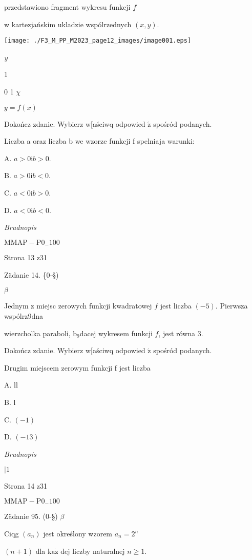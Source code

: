 \documentclass[a4paper,12pt]{article}
\begin{document}
przedstawiono fragment wykresu funkcji $f$

w kartezjańskim ukladzie wspólrzednych $(x,y).$
\begin{center}
\texttt{[image: ./F3\_M\_PP\_M2023\_page12\_images/image001.eps]}
\end{center}
{\it y}

1

0 1  $\chi$

$y=f(x)$

Dokończ zdanie. Wybierz w[aściwq odpowied $\acute{\mathrm{z}}$ spośród podanych.

Liczba a oraz liczba b we wzorze funkcji f spelniaja warunki:

A. $a>0 \mathrm{i} b>0.$

B. $a>0 \mathrm{i} b<0.$

C. $a<0 \mathrm{i} b>0.$

D. $a<0 \mathrm{i} b<0.$

{\it Brudnopis}

$\mathrm{M}\mathrm{M}\mathrm{A}\mathrm{P}-\mathrm{P}0_{-}100$

Strona 13 z31





Zädanie 14. \{0-\S)

$\beta$

Jednym z miejsc zerowych funkcji kwadratowej $f$ jest liczba $(-5)$. Pierwsza wspólrz9dna

wierzcholka paraboli, $\mathrm{b}_{9}$dacej wykresem funkcji $f$, jest równa 3.

Dokończ zdanie. Wybierz w[aściwq odpowied $\acute{\mathrm{z}}$ spośród podanych.

Drugim miejscem zerowym funkcji f jest liczba

A. ll

B. l

C. $(-1)$

D. $(-13)$

{\it Brudnopis}

$| 1$

Strona 14 z31

$\mathrm{M}\mathrm{M}\mathrm{A}\mathrm{P}-\mathrm{P}0_{-}100$





Zädanie 95. (0-\S) $\beta$

Ciqg $(a_{n})$ jest określony wzorem $a_{n}=2^{n}$

$(n+1)$ dla $\mathrm{k}\mathrm{a}\dot{\mathrm{z}}$ dej liczby naturalnej $n\geq 1.$
\end{document}
